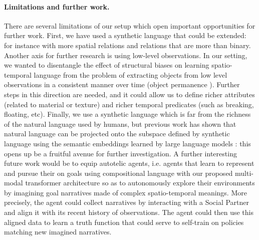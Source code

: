 \paragraph{Limitations and further work.} There are several limitations of our setup which open important opportunities for further work. First, we have used a synthetic language that could be extended: for instance with more spatial relations and relations that are more than binary. Another axis for further research is using low-level observations. In our setting, we wanted to disentangle the effect of structural biases on learning spatio-temporal language from the problem of extracting objects from low level observations \cite{burgess2019monet, greff2020multiobject, engelcke2020genesis, locatello2020objectcentric, carion2020endtoend} in a consistent manner over time (object permanence \cite{creswell2020alignnet, zhou2021hopper}). Further steps in this direction are needed, and it could allow us to define richer attributes (related to material or texture) and richer temporal predicates (such as breaking, floating, etc). Finally, we use a synthetic language which is far from the richness of the natural language used by humans, but previous work has shown that natural language can be projected onto the subspace defined by synthetic language using the semantic embeddings learned by large language models \cite{marzoev2020unnatural}: this opens up be a fruitful avenue for further investigation. A further interesting future work would be to equip autotelic agents, i.e. agents that learn to represent and pursue their on goals using compositional language \cite{imagine} with our proposed multi-modal transformer architecture so as to autonomously explore their environments by imagining goal narratives \cite{bruner1991narrative} made of complex spatio-temporal meanings. More precisely, the agent could collect narratives by interacting with a Social Partner and align it with its recent history of observations. The agent could then use this aligned data to learn a truth function that could serve to self-train on policies matching new imagined narratives.

